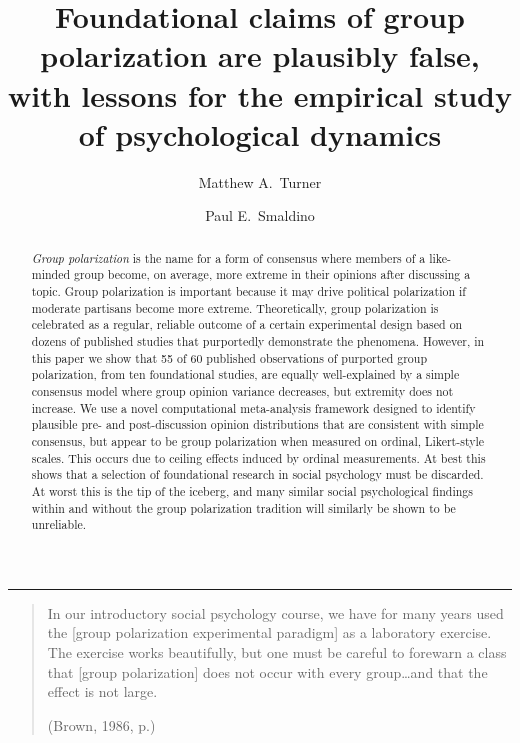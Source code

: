 \documentclass[
  abstract]{article}
\title{Foundational claims of group polarization are plausibly false,
with lessons for the empirical study of psychological dynamics}
\author[1,*]{{Matthew A.~Turner}}
\affil[1]{\small Division of Social Sciences, Stanford Doerr School of Sustainability, Stanford University}
\author[2,3]{{Paul E.~Smaldino}}
\affil[2]{\small Cognitive and Information Sciences, University of California, Merced}
\affil[3]{\small Santa Fe Institute}
\affil[*]{\small Correspondence: \href{mailto:maturner@stanford.edu}{maturner@stanford.edu}}
\date{}
\renewcommand*\contentsname{Table of contents}
\newcommand\contentsname{Table of contents}
\begin{document}
\maketitle
\begin{abstract}
\noindent \emph{Group polarization} is the name for a form of consensus
where members of a like-minded group become, on average, more extreme in
their opinions after discussing a topic. Group polarization is important
because it may drive political polarization if moderate partisans become
more extreme. Theoretically, group polarization is celebrated as a
regular, reliable outcome of a certain experimental design based on
dozens of published studies that purportedly demonstrate the phenomena.
However, in this paper we show that 55 of 60 published observations of
purported group polarization, from ten foundational studies, are equally
well-explained by a simple consensus model where group opinion variance
decreases, but extremity does not increase. We use a novel computational
meta-analysis framework designed to identify plausible pre- and
post-discussion opinion distributions that are consistent with simple
consensus, but appear to be group polarization when measured on ordinal,
Likert-style scales. This occurs due to ceiling effects induced by
ordinal measurements. At best this shows that a selection of
foundational research in social psychology must be discarded. At worst
this is the tip of the iceberg, and many similar social psychological
findings within and without the group polarization tradition will
similarly be shown to be unreliable.
\end{abstract}

\renewcommand*\contentsname{Table of contents}
{
\hypersetup{linkcolor=gray}
\setcounter{tocdepth}{3}
\tableofcontents
}

\begin{center} \noindent\rule{4cm}{0.4pt} \end{center}
\clearpage

\begin{quote}
In our introductory social psychology course, 
we have for many years used the [group polarization experimental paradigm] as
a laboratory exercise. The exercise works beautifully, but one must be
careful to forewarn a class that [group polarization] does not occur with every 
group\ldots and that the effect is not large. 
\par\raggedleft(Brown, 1986, p.\cite[p. 205]{Brown1986})
\end{quote}
\end{document}

